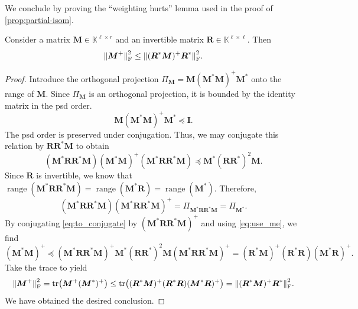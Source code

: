 \documentclass[11pt]{article}
\newcommand{\field}{\mathbb{K}}
\DeclareMathOperator{\tr}{tr}
\DeclareMathOperator{\range}{range}
\newcommand{\mat}[1]{\boldsymbol{#1}}
\newcommand{\norm}[1]{\mleft\| #1 \mright\|}
\newcommand{\Id}{\mathbf{I}}
\theoremstyle{definition}
\numberwithin{equation}{section}
\begin{document}
We conclude by proving the ``weighting hurts'' lemma used in the proof of \cref{prop:partial-isom}.

\begin{lemma} \label{lem:weighting_hurts}
Consider a matrix $\mat{M} \in \field^{\ell \times r}$ and an invertible matrix $\mat{R} \in \field^{\ell \times \ell}$.
Then
\begin{equation}
\label{eq:to_verify}
    \norm{\smash{\mat{M}^+}}^2_{\rm F} \leq \norm{\smash{(\mat{R}^* \mat{M})^+ \mat{R}^*}}_{\rm F}^2.
\end{equation}
\end{lemma}
\begin{proof}
Introduce the orthogonal projection $\mat{\varPi}_{\mat{M}} = \mat{M} (\mat{M}^* \mat{M})^+ \mat{M}^*$ onto the range of $\mat{M}$.
Since $\mat{\varPi}_{\mat{M}}$ is an orthogonal projection, it is bounded by the identity matrix in the psd order.
%
\begin{equation*}
    \mat{M} (\mat{M}^* \mat{M})^+ \mat{M}^* \preccurlyeq \Id. 
\end{equation*}
%
The psd order is preserved under conjugation.
Thus, we may conjugate this relation by $\mat{R} \mat{R}^* \mat{M}$ to obtain
\begin{equation}
\label{eq:to_conjugate}
    (\mat{M}^* \mat{R} \mat{R}^* \mat{M}) (\mat{M}^* \mat{M})^{+} (\mat{M}^* \mat{R} \mat{R}^* \mat{M})
    \preccurlyeq  \mat{M}^* (\mat{R} \mat{R}^*)^2 \mat{M}.
\end{equation}
Since $\mat{R}$ is invertible, we know that $\range(\mat{M}^* \mat{R} \mat{R}^* \mat{M})
    = \range(\mat{M}^* \mat{R}) = \range(\mat{M}^*)$.
Therefore,
\begin{equation}
\label{eq:use_me}
    (\mat{M}^* \mat{R} \mat{R}^* \mat{M}) 
    (\mat{M}^* \mat{R} \mat{R}^* \mat{M})^+
    = \mat{\varPi}_{\mat{M}^* \mat{R} \mat{R}^* \mat{M}} 
    = \mat{\varPi}_{\mat{M}^*}.
\end{equation}
By conjugating \cref{eq:to_conjugate} by $(\mat{M}^* \mat{R} \mat{R}^* \mat{M})^+$ and using \cref{eq:use_me}, we find
\begin{equation*}
    (\mat{M}^* \mat{M})^{+}
    \preccurlyeq  
    (\mat{M}^* \mat{R} \mat{R}^* \mat{M})^+
    \mat{M}^* (\mat{R} \mat{R}^*)^2 \mat{M}
    (\mat{M}^* \mat{R} \mat{R}^* \mat{M})^+ = (\mat{R}^* \mat{M})^+ (\mat{R}^* \mat{R}) (\mat{M}^* \mat{R})^+.
\end{equation*}
%
Take the trace to yield
\begin{equation*}
    \norm{\smash{\mat{M}^+}}^2_{\rm F} = \tr\bigl(\mat{M}^+ (\mat{M}^*)^+\bigr)
    \leq \tr\bigl((\mat{R}^* \mat{M})^+ (\mat{R}^* \mat{R}) (\mat{M}^* \mat{R})^+\bigr) = \norm{\smash{(\mat{R}^* \mat{M})^+ \mat{R}^*}}_{\rm F}^2.
\end{equation*}
%
We have obtained the desired conclusion.
\end{proof}
\end{document}
